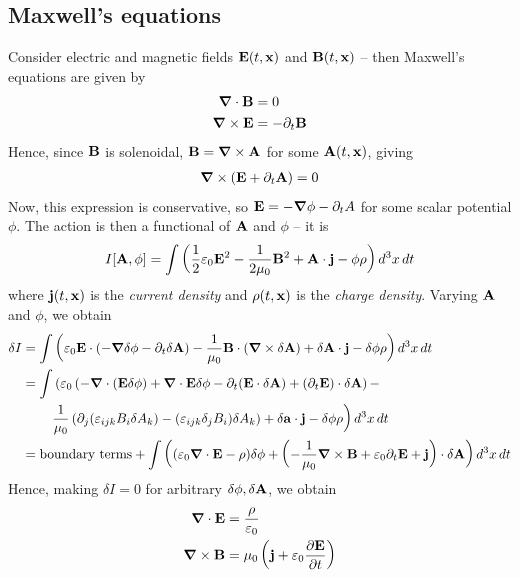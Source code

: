 \documentclass{../../template/note}
\begin{document}
    \subsection{Maxwell's equations}

    Consider electric and magnetic fields $\V E(t, \V x)$ and $\V B(t, \V x)$ -- then Maxwell's equations are given by
    \begin{align*}
        \div \V B &= 0 \\
        \curl \V E &= -\pr_t \V B
    \end{align*}
    Hence, since $\V B$ is solenoidal, $\V B = \curl \V A$ for some $\V A(t, \V x)$, giving
    \begin{align*}
        \curl(\V E + \pr_t \V A) = 0
    \end{align*}
    Now, this expression is conservative, so $\V E = -\grad \phi - \pr_t A$ for some scalar potential $\phi$. The action is then a functional of $\V A$ and $\phi$ -- it is
    \begin{align*}
        I[\V A, \phi] = \int \left(\frac 1 2 \eps_0 \V E^2 - \frac{1}{2\mu_0} \V B^2 + \V A \cdot \V j - \phi\rho\right) d^3 x \D t
    \end{align*}
    where $\V j(t, \V x)$ is the \emph{current density} and $\rho(t, \V x)$ is the \emph{charge density}. Varying $\V A$ and $\phi$, we obtain
    \begin{align*}
        \delta I &= \int \left(\eps_0 \V E \cdot (-\grad \delta \phi - \pr_t \delta \V A) - \frac 1 {\mu_0} \V B \cdot (\curl \delta \V A) + \delta \V A \cdot \V j - \delta \phi \rho \right) d^3 x \D t \\
        &= \int \left(\eps_0 \left(-\div(\V E \delta \phi) + \div \V E \delta \phi - \pr_t (\V E \cdot \delta \V A) + (\pr_t \V E) \cdot \delta \V A\right) -\right.  \\
        & \qquad \left.\frac 1 {\mu_0} \left(\pr_j (\eps_{ijk} B_i \delta A_k) - (\eps_{ijk} \delta_j B_i)\delta A_k\right) + \delta \V a \cdot \V j - \delta \phi \rho\right) d^3 x \D t \\
        &= \text{boundary terms} + \int \left( (\eps_0 \div \V E - \rho) \delta \phi + \left(-\frac 1 {\mu_0} \curl \V B + \eps_0 \pr_t \V E + \V j\right) \cdot \delta \V A\right) d^3 x \D t
    \end{align*}
    Hence, making $\delta I = 0$ for arbitrary $\delta \phi, \delta \V A$, we obtain
    \begin{align*}
        \div \V E &= \frac{\rho}{\eps_0} \\
        \curl \V B &= \mu_0 \left(\V j + \eps_0 \pd{\V E}{t}\right)
    \end{align*}
    
\end{document}

